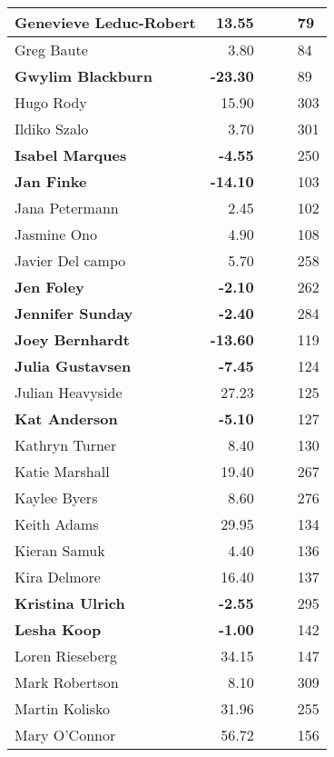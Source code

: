 \begin{longtable}{|p{5cm}|r|p{9cm}|p{6cm}|l|}
   \hline
Genevieve Leduc-Robert & 13.55 &  &  &  79 \\ 
   \hline
Greg Baute & 3.80 &  &  &  84 \\ 
   \hline
\textbf{Gwylim Blackburn} & \textbf{-23.30} &  &  &  89 \\ 
   \hline
Hugo Rody & 15.90 &  &  & 303 \\ 
   \hline
Ildiko Szalo & 3.70 &  &  & 301 \\ 
   \hline
\textbf{Isabel Marques} & \textbf{-4.55} &  &  & 250 \\ 
   \hline
\textbf{Jan Finke} & \textbf{-14.10} &  &  & 103 \\ 
   \hline
Jana Petermann & 2.45 &  &  & 102 \\ 
   \hline
Jasmine Ono & 4.90 &  &  & 108 \\ 
   \hline
Javier Del campo & 5.70 &  &  & 258 \\ 
   \hline
\textbf{Jen Foley} & \textbf{-2.10} &  &  & 262 \\ 
   \hline
\textbf{Jennifer Sunday} & \textbf{-2.40} &  &  & 284 \\ 
   \hline
\textbf{Joey Bernhardt} & \textbf{-13.60} &  &  & 119 \\ 
   \hline
\textbf{Julia Gustavsen} & \textbf{-7.45} &  &  & 124 \\ 
   \hline
Julian Heavyside & 27.23 &  &  & 125 \\ 
   \hline
\textbf{Kat Anderson} & \textbf{-5.10} &  &  & 127 \\ 
   \hline
Kathryn Turner & 8.40 &  &  & 130 \\ 
   \hline
Katie Marshall & 19.40 &  &  & 267 \\ 
   \hline
Kaylee Byers & 8.60 &  &  & 276 \\ 
   \hline
Keith Adams & 29.95 &  &  & 134 \\ 
   \hline
Kieran Samuk & 4.40 &  &  & 136 \\ 
   \hline
Kira Delmore & 16.40 &  &  & 137 \\ 
   \hline
\textbf{Kristina Ulrich} & \textbf{-2.55} &  &  & 295 \\ 
   \hline
\textbf{Lesha Koop} & \textbf{-1.00} &  &  & 142 \\ 
   \hline
Loren Rieseberg & 34.15 &  &  & 147 \\ 
   \hline
Mark Robertson & 8.10 &  &  & 309 \\ 
   \hline
Martin Kolisko & 31.96 &  &  & 255 \\ 
   \hline
Mary O'Connor & 56.72 &  &  & 156 \\ 

\end{longtable}
